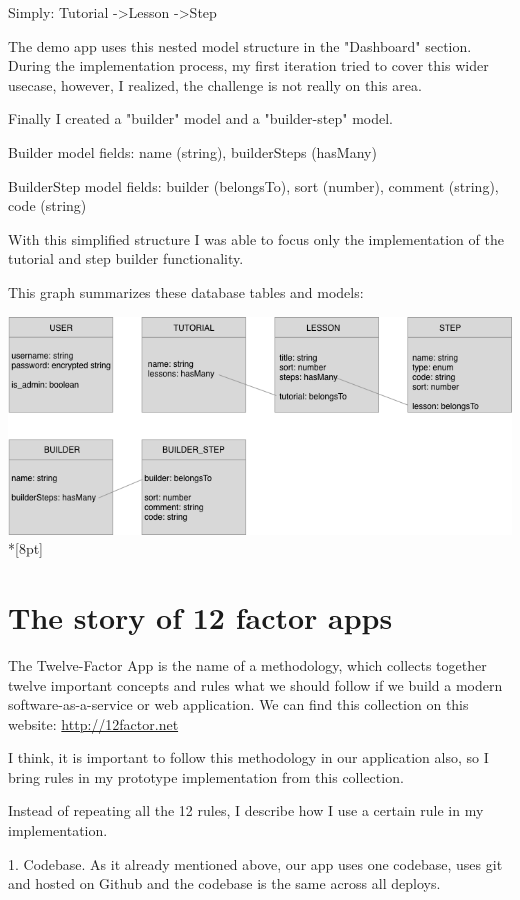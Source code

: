 \documentclass[12pt, a4paper, oneside, openright, medskipamount]{report}
\begin{document}
Simply: Tutorial -\textgreater Lesson -\textgreater Step

The demo app uses this nested model structure in the "Dashboard" section. During the implementation process, my first iteration tried to cover this wider usecase, however, I realized, the challenge is not really on this area.

Finally I created a "builder" model and a "builder-step" model.

Builder model fields: name (string), builderSteps (hasMany)

BuilderStep model fields: builder (belongsTo), sort (number), comment (string), code (string)

With this simplified structure I was able to focus only the implementation of the tutorial and step builder functionality.

This graph summarizes these database tables and models:

\includegraphics[width=1\textwidth]{assets/database-tables}\\*[8pt]

\section{The story of 12 factor apps}

The Twelve-Factor App is the name of a methodology, which collects together twelve important concepts and rules what we should follow if we build a modern software-as-a-service or web application. We can find this collection on this website: \url{http://12factor.net}

I think, it is important to follow this methodology in our application also, so I bring rules in my prototype implementation from this collection.

Instead of repeating all the 12 rules, I describe how I use a certain rule in my implementation.

1. Codebase. As it already mentioned above, our app uses one codebase, uses git and hosted on Github and the codebase is the same across all deploys.
\end{document}
